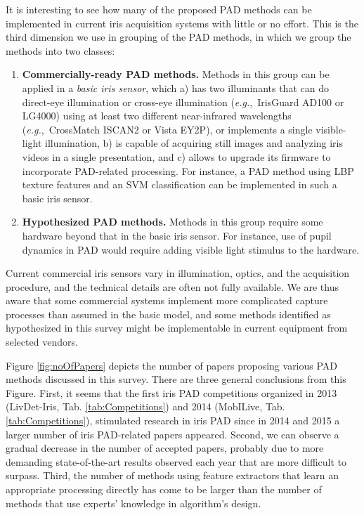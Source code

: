 \documentclass[format=acmsmall, review=false, timestamp=false]{acmart}
\newcommand{\eg}{{\it e.g.},~}
\begin{document}
It is interesting to see how many of the proposed PAD methods can be implemented in current iris acquisition systems with little or no effort. This is the third dimension we use in grouping of the PAD methods, in which we group the methods into two classes:

\begin{enumerate}[label=\textbf{\arabic*})]
    \item {\bf Commercially-ready PAD methods.} Methods in this group can be applied in a {\it basic iris sensor}, which a) has two illuminants that can do direct-eye illumination or cross-eye illumination (\eg IrisGuard AD100 or LG4000) using at least two different near-infrared wavelengths (\eg CrossMatch ISCAN2 or Vista EY2P), or implements a single visible-light illumination, b) is capable of acquiring still images and analyzing iris videos in a single presentation, and c) allows to upgrade its firmware to incorporate PAD-related processing. For instance, a PAD method using LBP texture features and an SVM classification can be implemented in such a basic iris sensor. 
    \item {\bf Hypothesized PAD methods.} Methods in this group require some hardware beyond that in the basic iris sensor. For instance, use of pupil dynamics in PAD would require adding visible light stimulus to the hardware.
\end{enumerate}

Current commercial iris sensors vary in illumination, optics, and the acquisition procedure, and the technical details are often not fully available. We are thus aware that some commercial systems implement more complicated capture processes than assumed in the basic model, and some methods identified as hypothesized in this survey might be implementable in current equipment from selected vendors.

Figure \ref{fig:noOfPapers} depicts the number of papers proposing various PAD methods discussed in this survey. There are three general conclusions from this Figure. First, it seems that the first iris PAD competitions organized in 2013 (LivDet-Iris, Tab. \ref{tab:Competitions}) and 2014 (MobILive, Tab. \ref{tab:Competitions}), stimulated research in iris PAD since in 2014 and 2015 a larger number of iris PAD-related papers appeared. Second, we can observe a gradual decrease in the number of accepted papers, probably due to more demanding state-of-the-art results observed each year that are more difficult to surpass. Third, the number of methods using feature extractors that learn an appropriate processing directly has come to be larger than the number of methods that use experts' knowledge in algorithm's design.
\end{document}
